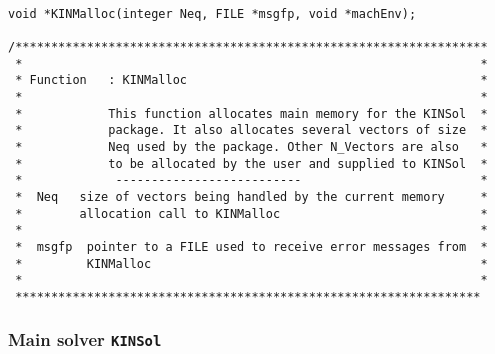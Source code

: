 \small
\begin{verbatim}

void *KINMalloc(integer Neq, FILE *msgfp, void *machEnv);

/******************************************************************
 *                                                                *
 * Function   : KINMalloc                                         *
 *                                                                *
 *            This function allocates main memory for the KINSol  *
 *            package. It also allocates several vectors of size  *
 *            Neq used by the package. Other N_Vectors are also   *
 *            to be allocated by the user and supplied to KINSol  *
 *             --------------------------                         *
 *  Neq   size of vectors being handled by the current memory     *
 *        allocation call to KINMalloc                            *
 *                                                                *
 *  msgfp  pointer to a FILE used to receive error messages from  *
 *         KINMalloc                                              *
 *                                                                *
 *****************************************************************
\end{verbatim}
\normalsize

\subsubsection{Main solver  {\tt KINSol}}

